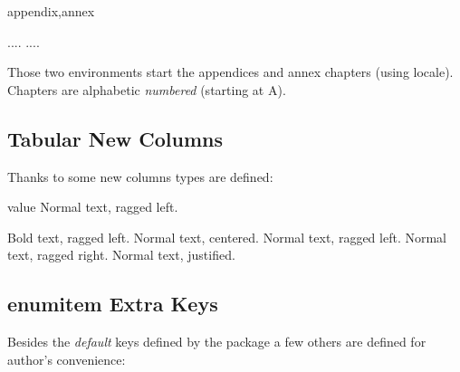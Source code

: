\documentclass[article,nogeometry,english,tocdepth=3,secdepth=3]{ufrgscca} %
\begin{document}
\begin{codedescribe}[env]{appendix,annex}
	\begin{codesyntax}%
		\tsmacro{\begin{appendix}}{}.... \tsmacro{\end{appendix}}{}
		\tsmacro{\begin{annex}}{}.... \tsmacro{\end{annex}}{}
	\end{codesyntax}
\end{codedescribe}
Those two environments start the appendices and annex chapters (using locale). Chapters are  alphabetic \emph{numbered} (starting at A).
\subsection{Tabular New Columns}
Thanks to  some new columns types are defined:
\begin{describelist}{value}
	 {  Normal text, ragged left.}

	 {  Bold text, ragged left.}
	 {  Normal text, centered.}
	 {  Normal text, ragged left.}
	 {  Normal text, ragged right.}
	 {  Normal text, justified.}
	\end{describelist}



\subsection{enumitem Extra Keys}
Besides the \emph{default} keys defined by the  package a few others are defined for author's convenience:
\end{document}
